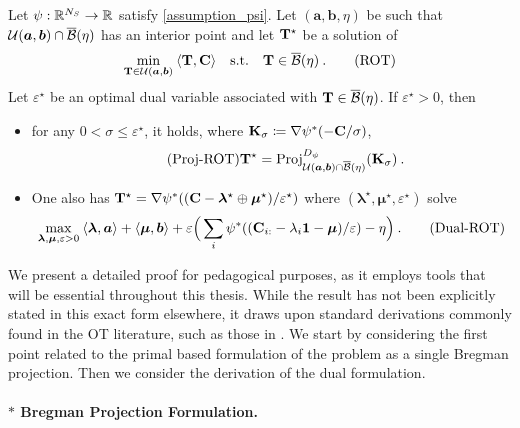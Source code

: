 \begin{proposition}\label{prop:cot}
    Let $\psi : \mathbb{R}^{N_S} \to \mathbb{R}$ satisfy \cref{assumption_psi}. Let $(\bm{a}, \bm{b}, \eta)$ be such that ${\mathcal{U}}(\bm{a}, \bm{b}) \cap \overline{\mathcal{B}}(\eta)$ has an interior point and let ${\mathbf{T}}^\star$ be a solution of
\begin{align}
    \min_{{\mathbf{T}} \in {\mathcal{U}}(\bm{a}, \bm{b})} \: \langle {\mathbf{T}}, {\mathbf{C}} \rangle \quad \text{s.t.} \quad  {\mathbf{T}} \in \overline{\mathcal{B}}(\eta) \:.
    \tag{ROT}
\end{align}
    Let $\varepsilon^\star$ be an optimal dual variable associated with ${\mathbf{T}} \in \overline{\mathcal{B}}(\eta)$.
    If $\varepsilon^\star > 0$, then
    \begin{itemize}[leftmargin=*, labelsep=0.1em]
        \item for any $0 < \sigma \leq \varepsilon^\star$, it holds, where ${\mathbf{K}}_\sigma \coloneqq \nabla \psi^*(-{\mathbf{C}}/ \sigma)$, 
        \begin{align}\label{eq:proj-rot}\tag{Proj-ROT}
            {\mathbf{T}}^\star = \operatorname{Proj}^{D_\psi}_{{\mathcal{U}}(\bm{a}, \bm{b}) \cap \overline{\mathcal{B}}(\eta)}({\mathbf{K}}_\sigma) \:.
        \end{align}
        \item One also has ${\mathbf{T}}^\star = \nabla \psi^*(({\mathbf{C}} - \bm{\lambda}^\star \oplus \bm{\mu}^\star) / \varepsilon^\star)$
        where $(\bm{\lambda}^\star, \bm{\mu}^\star, \varepsilon^\star)$ solve
        \begin{align}\label{eq:dual-rot}
            \max_{\bm{\lambda}, \bm{\mu}, \varepsilon>0}  \: \langle \bm{\lambda}, \bm{a} \rangle + \langle \bm{\mu}, \bm{b} \rangle + \varepsilon \Big(\sum_i \psi^*((\mathbf{C}_{i:} - \lambda_i \bm{1} - \bm{\mu}) / \varepsilon) - \eta \Big) \:.
        \tag{Dual-ROT}
        \end{align}
    \end{itemize}
\end{proposition}

We present a detailed proof for pedagogical purposes, as it employs tools that will be essential throughout this thesis. While the result has not been explicitly stated in this exact form elsewhere, it draws upon standard derivations commonly found in the OT literature, such as those in \citep{peyre2019computational}. We start by considering the first point related to the primal based formulation of the problem as a single Bregman projection. Then we consider the derivation of the dual formulation.

\paragraph{$\ast$ Bregman Projection Formulation.}

